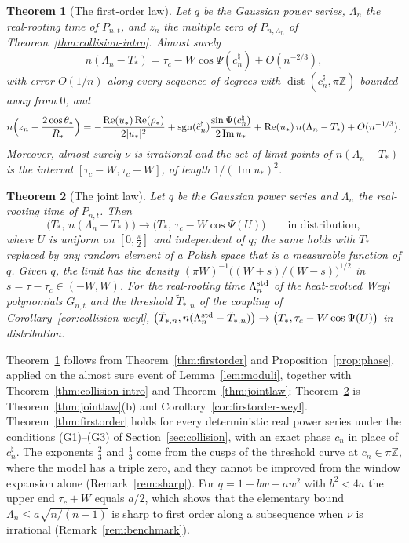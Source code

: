 \documentclass[11pt]{amsart}
\newtheorem{theorem}{Theorem}[section]
\theoremstyle{definition}
\theoremstyle{remark}
\numberwithin{equation}{section}
\newcommand{\Z}{\mathbb{Z}}
\DeclareMathOperator{\re}{Re}
\DeclareMathOperator{\im}{Im}
\DeclareMathOperator{\dist}{dist}
\begin{document}
\begin{theorem}[The first-order law]\label{thm:firstorder-intro}
Let $q$ be the Gaussian power series, $\Lambda_n$ the real-rooting time of $P_{n,t}$, and $z_n$ the multiple zero of $P_{n,\Lambda_n}$ of Theorem~\ref{thm:collision-intro}. Almost surely
\[
n(\Lambda_n-T_*)=\tau_c-W\cos\Psi(c_n^\natural)+O(n^{-2/3}),
\]
with error $O(1/n)$ along every sequence of degrees with $\dist(c_n^\natural,\pi\Z)$ bounded away from $0$, and
\[
n\Bigl(z_n-\frac{2\cos\theta_*}{R_*}\Bigr)=-\frac{\re(u_*)\re(\rho_*)}{2|u_*|^2}+\operatorname{sgn}(\tilde c_n^\natural)
\frac{\sin\Psi(c_n^\natural)}{2\im u_*}+\re(u_*)\,n(\Lambda_n-T_*)+O(n^{-1/3}).
\]
Moreover, almost surely $\nu$ is irrational and the set of limit points of $n(\Lambda_n-T_*)$ is the interval $[\tau_c-W,\tau_c+W]$, of length $1/(\im u_*)^2$.
\end{theorem}

\begin{theorem}[The joint law]\label{thm:jointlaw-intro}
Let $q$ be the Gaussian power series and $\Lambda_n$ the real-rooting time of $P_{n,t}$. Then
\[
\bigl(T_*,\,n(\Lambda_n-T_*)\bigr)\longrightarrow\bigl(T_*,\,\tau_c-W\cos\Psi(U)\bigr)\qquad\text{in distribution},
\]
where $U$ is uniform on $[0,\frac\pi2]$ and independent of $q$; the same holds with $T_*$ replaced by any random element of a Polish space that is a measurable function of $q$. Given $q$, the limit has the density $(\pi W)^{-1}\bigl((W+s)/(W-s)\bigr)^{1/2}$ in $s=\tau-\tau_c\in(-W,W)$. For the real-rooting time $\Lambda_n^{\rm std}$ of the heat-evolved Weyl polynomials $G_{n,t}$ and the threshold $\tilde T_{*,n}$ of the coupling of Corollary~\ref{cor:collision-weyl}, $\bigl(\tilde T_{*,n},n(\Lambda_n^{\rm std}-\tilde T_{*,n})\bigr)\to\bigl(T_*,\tau_c-W\cos\Psi(U)\bigr)$ in distribution.
\end{theorem}

Theorem~\ref{thm:firstorder-intro} follows from Theorem~\ref{thm:firstorder} and Proposition~\ref{prop:phase}, applied on the almost sure event of Lemma~\ref{lem:moduli}, together with Theorem~\ref{thm:collision-intro} and Theorem~\ref{thm:jointlaw}; Theorem~\ref{thm:jointlaw-intro} is Theorem~\ref{thm:jointlaw}(b) and Corollary~\ref{cor:firstorder-weyl}. Theorem~\ref{thm:firstorder} holds for every deterministic real power series under the conditions (G1)--(G3) of Section~\ref{sec:collision}, with an exact phase $c_n$ in place of $c_n^\natural$. The exponents $\frac23$ and $\frac13$ come from the cusps of the threshold curve at $c_n\in\pi\Z$, where the model has a triple zero, and they cannot be improved from the window expansion alone (Remark~\ref{rem:sharp}). For $q=1+bw+aw^2$ with $b^2<4a$ the upper end $\tau_c+W$ equals $a/2$, which shows that the elementary bound $\Lambda_n\le a\sqrt{n/(n-1)}$ is sharp to first order along a subsequence when $\nu$ is irrational (Remark~\ref{rem:benchmark}).
\end{document}

